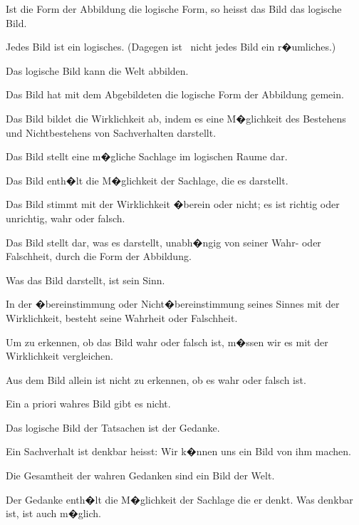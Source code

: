 {Ist die Form der Abbildung die logische Form,
so heisst das Bild das logische Bild.}


{Jedes Bild ist  ein logisches. (Dagegen
ist \zumBeispiel\ nicht jedes Bild ein r�umliches.)}


{Das logische Bild kann die Welt abbilden.}


{Das Bild hat mit dem Abgebildeten die logische
Form der Abbildung gemein.}


{Das Bild bildet die Wirklichkeit ab, indem es
eine M�glichkeit des Bestehens und Nichtbestehens
von Sachverhalten darstellt.}


{Das Bild stellt eine m�gliche Sachlage im
logischen Raume dar.}


{Das Bild enth�lt die M�glichkeit der Sachlage,
die es darstellt.}


{Das Bild stimmt mit der Wirklichkeit �berein
oder nicht; es ist richtig oder unrichtig, wahr
oder falsch.}


{{\stretchyspace
Das Bild stellt dar, was es darstellt, unabh�ngig
von seiner Wahr- oder Falschheit, durch die Form
der Abbildung.}}


{Was das Bild darstellt, ist sein Sinn.}


{In der �bereinstimmung oder Nicht�bereinstimmung
seines Sinnes mit der Wirklichkeit,
besteht seine Wahrheit oder Falschheit.}


{Um zu erkennen, ob das Bild wahr oder falsch
ist, m�ssen wir es mit der Wirklichkeit vergleichen.}


{Aus dem Bild allein ist nicht zu erkennen, ob
es wahr oder falsch ist.}


{Ein a priori wahres Bild gibt es nicht.}


{Das logische Bild der Tatsachen ist der
Gedanke.}


{\glqq{}Ein Sachverhalt ist denkbar\grqq{} heisst: Wir
k�nnen uns ein Bild von ihm machen.}


{Die Gesamtheit der wahren Gedanken sind
ein Bild der Welt.}


{Der Gedanke enth�lt die M�glichkeit der
Sachlage die er denkt. Was denkbar ist, ist
auch m�glich.}


